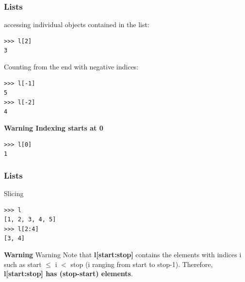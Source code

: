 \documentclass[colorlinks]{beamer}
\begin{document}
\begin{frame}[fragile]\frametitle{Lists}
\begin{block}{accessing individual objects contained in the list:}
\tiny
\begin{verbatim}
>>> l[2]
3
\end{verbatim}

\end{block}
\begin{block}{Counting from the end with negative indices:}
\tiny
\begin{verbatim}
>>> l[-1]
5
>>> l[-2]
4
\end{verbatim}

\end{block}
\begin{block}{{\color{green}\textbf{Warning Indexing starts at 0} }}
\tiny
\begin{verbatim}
>>> l[0]
1
\end{verbatim}

\end{block}
\end{frame}

\begin{frame}[fragile]\frametitle{Lists}
\begin{block}{Slicing}
\begin{verbatim}
>>> l
[1, 2, 3, 4, 5]
>>> l[2:4]
[3, 4]
\end{verbatim}


\end{block}
\begin{block}{{\color{green}\textbf{Warning} }}
Warning Note that \textbf{l[start:stop]} contains the elements with indices i such as start $\le$ i $<$ stop (i ranging from start to stop-1). Therefore, \textbf{l[start:stop] has (stop-start) elements}.
\end{block}

\end{frame}
\end{document}

